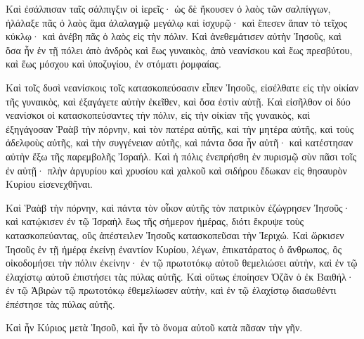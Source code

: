{\par }{\PP {}Καὶ ἐσάλπισαν ταῖς σάλπιγξιν οἱ ἱερεῖς· ὡς δὲ ἤκουσεν ὁ λαὸς τῶν σαλπίγγων, ἠλάλαξε πᾶς ὁ λαὸς ἅμα ἀλαλαγμῷ μεγάλῳ καὶ ἰσχυρῷ· καὶ ἔπεσεν ἅπαν τὸ τεῖχος κύκλῳ· καὶ ἀνέβη πᾶς ὁ λαὸς εἰς τὴν πόλιν.
Καὶ ἀνεθεμάτισεν αὐτὴν Ἰησοῦς, καὶ ὅσα ἦν ἐν τῇ πόλει ἀπὸ ἀνδρὸς καὶ ἕως γυναικὸς, ἀπὸ νεανίσκου καὶ ἕως πρεσβύτου, καὶ ἕως μόσχου καὶ ὑποζυγίου, ἐν στόματι ῥομφαίας.
\par }{\PP {}Καὶ τοῖς δυσὶ νεανίσκοις τοῖς κατασκοπεύσασιν εἶπεν Ἰησοῦς, εἰσέλθατε εἰς τὴν οἰκίαν τῆς γυναικὸς, καὶ ἐξαγάγετε αὐτὴν ἐκεῖθεν, καὶ ὅσα ἐστὶν αὐτῇ.
Καὶ εἰσῆλθον οἱ δύο νεανίσκοι οἱ κατασκοπεύσαντες τὴν πόλιν, εἰς τὴν οἰκίαν τῆς γυναικὸς, καὶ ἐξηγάγοσαν Ῥαὰβ τὴν πόρνην, καὶ τὸν πατέρα αὐτῆς, καὶ τὴν μητέρα αὐτῆς, καὶ τοὺς ἀδελφοὺς αὐτῆς, καὶ τὴν συγγένειαν αὐτῆς, καὶ πάντα ὅσα ἦν αὐτῆ· καὶ κατέστησαν αὐτὴν ἔξω τῆς παρεμβολῆς Ἰσραήλ.
Καὶ ἡ πόλις ἐνεπρήσθη ἐν πυρισμῷ σὺν πᾶσι τοῖς ἐν αὐτῇ· πλὴν ἀργυρίου καὶ χρυσίου καὶ χαλκοῦ καὶ σιδήρου ἔδωκαν εἰς θησαυρὸν Κυρίου εἰσενεχθῆναι.
\par }{\PP {}Καὶ Ῥαὰβ τὴν πόρνην, καὶ πάντα τὸν οἶκον αὐτῆς τὸν πατρικὸν ἐζώγρησεν Ἰησοῦς· καὶ κατῴκισεν ἐν τῷ Ἰσραὴλ ἕως τῆς σήμερον ἡμέρας, διότι ἔκρυψε τοὺς κατασκοπεύαντας, οὓς ἀπέστειλεν Ἰησοῦς κατασκοπεῦσαι τὴν Ἱεριχώ.
Καὶ ὥρκισεν Ἰησοῦς ἐν τῇ ἡμέρᾳ ἐκείνῃ ἐναντίον Κυρίου, λέγων, ἐπικατάρατος ὁ ἄνθρωπος, ὃς οἰκοδομήσει τὴν πόλιν ἐκείνην· ἐν τῷ πρωτοτόκῳ αὐτοῦ θεμελιώσει αὐτὴν, καὶ ἐν τῷ ἐλαχίστῳ αὐτοῦ ἐπιστήσει τὰς πύλας αὐτῆς. Καὶ οὕτως ἐποίησεν Ὁζᾶν ὁ ἐκ Βαιθήλ· ἐν τῷ Ἀβιρὼν τῷ πρωτοτόκῳ ἐθεμελίωσεν αὐτὴν, καὶ ἐν τῷ ἐλαχίστῳ διασωθέντι ἐπέστησε τὰς πύλας αὐτῆς.
\par }{\PP {}Καὶ ἦν Κύριος μετὰ Ἰησοῦ, καὶ ἦν τὸ ὄνομα αὐτοῦ κατὰ πᾶσαν τὴν γῆν.

}
